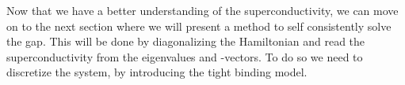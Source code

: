 \documentclass[../main.tex]{subfile}
\begin{document}
Now that we have a better understanding of the superconductivity, we can move on to the next section where we will present a method to self consistently solve
the gap. This will be done by diagonalizing the Hamiltonian and read the superconductivity from the eigenvalues and -vectors. To do so we need to discretize the
system, by introducing the tight binding model.\\
\end{document}
